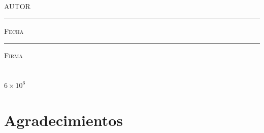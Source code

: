 \documentclass[11pt]{book}
\begin{document}
\centering

\hspace{3em}

\textsc{AUTOR}

\vspace{5em}

\rule[1em]{20em}{0.5pt} %

\textsc{Fecha}
 
\vspace{8em}

\rule[1em]{20em}{0.5pt} %

\textsc{Firma}

\endgroup
\vspace*{\fill}



\pagestyle{empty}
\frontmatter

\chapter*{}
\begin{flushright}
\textit{$6\times 10^6$}
\end{flushright}



\chapter*{Agradecimientos}
\end{document}
